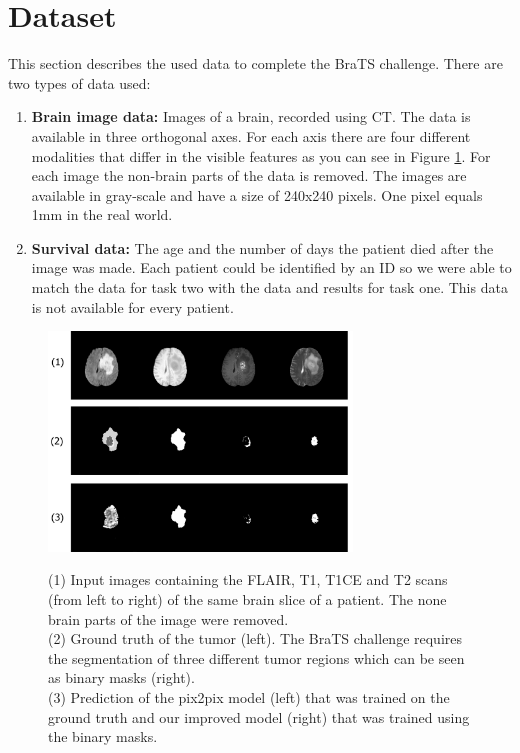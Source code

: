 \documentclass[a4paper,12pt,pagesize,headsepline,bibtotoc,titlepage]{scrartcl}
\begin{document}
\section{Dataset}
\label{sec:dataset}

This section describes the used data to complete the BraTS challenge. There are two types of data used:

\begin{enumerate}
\item \textbf{Brain image data:} Images of a brain, recorded using CT. The data is available in three orthogonal axes. For each axis there are four different modalities that differ in the visible features as you can see in Figure \ref{fig:demo_input}. For each image the non-brain parts of the data is removed. The images are available in gray-scale and have a size of 240x240 pixels. One pixel equals 1mm in the real world.
\item \textbf{Survival data:} The age and the number of days the patient died after the image was made. Each patient could be identified by an ID so we were able to match the data for task two with the data and results for task one. This data is not available for every patient.
\end{enumerate}

\begin{figure}[t]
\begin{center}
\includegraphics*[width=0.72\textwidth]{images/all.png}\\
\caption{(1) Input images containing the FLAIR, T1, T1CE and T2 scans (from left to right) of the same brain slice of a patient. The none brain parts of the image were removed.\\
(2) Ground truth of the tumor (left). The BraTS challenge requires the segmentation of three different tumor regions which can be seen as binary masks (right).\\
(3) Prediction of the pix2pix model (left) that was trained on the ground truth and our improved model (right) that was trained using the binary masks.}
\label{fig:demo_input}
\end{center}
\end{figure}
\end{document}
